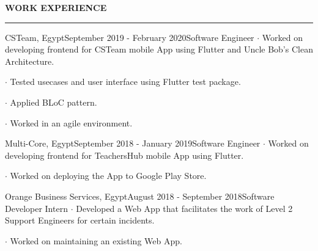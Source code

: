\noindent\textcolor{themecolor}{\textbf{WORK EXPERIENCE}}

\vspace{2mm}
\hrule
\vspace{3mm}

\begin{verbose}{CSTeam, Egypt}{September 2019 - February 2020}{Software Engineer}
    \noindent $\cdot$ Worked on developing frontend for CSTeam mobile App using Flutter and Uncle Bob's Clean Architecture.

    \noindent $\cdot$ Tested usecases and user interface using Flutter test package.
    
    \noindent $\cdot$ Applied BLoC pattern.
    
    \noindent $\cdot$ Worked in an agile environment.
\end{verbose}

\vspace{3mm}

\begin{verbose}{Multi-Core, Egypt}{September 2018 - January 2019}{Software Engineer}
    \noindent $\cdot$ Worked on developing frontend for TeachersHub mobile App using Flutter.

    \noindent $\cdot$ Worked on deploying the App to Google Play Store.
\end{verbose}

\vspace{3mm}

\begin{verbose}{Orange Business Services, Egypt}{August 2018 - September 2018}{Software Developer Intern}
    \noindent $\cdot$ Developed a Web App that facilitates the work of Level 2 Support Engineers for certain incidents.

    \noindent $\cdot$ Worked on maintaining an existing Web App.
\end{verbose}

